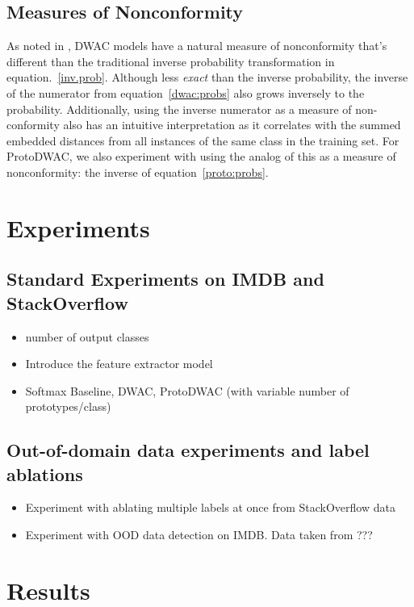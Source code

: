 \documentclass[11pt,letterpaper]{article}
\begin{document}
\subsection{Measures of Nonconformity}
As noted in \cite{card.2019}, DWAC models have a natural measure of nonconformity that's different than the traditional inverse probability transformation in equation.~\ref{inv.prob}. Although less \textit{exact} than the inverse probability, the inverse of the numerator from equation~\ref{dwac:probs} also grows inversely to the probability. Additionally, using the inverse numerator as a measure of non-conformity also has an intuitive interpretation as it correlates with the summed embedded distances from all instances of the same class in the training set. For ProtoDWAC, we also experiment with using the analog of this as a measure of nonconformity: the inverse of equation~\ref{proto:probs}.



\section{Experiments}
\subsection{Standard Experiments on IMDB and StackOverflow}
\begin{itemize}
  \item number of output classes
  \item Introduce the feature extractor model \citet{mullenbach.2018}
  \item Softmax Baseline, DWAC, ProtoDWAC (with variable number of prototypes/class)
\end{itemize}

\subsection{Out-of-domain data experiments and label ablations}
\begin{itemize}
  \item Experiment with ablating multiple labels at once from StackOverflow data
  \item Experiment with OOD data detection on IMDB. Data taken from ???
\end{itemize}

\section{Results}
\end{document}
